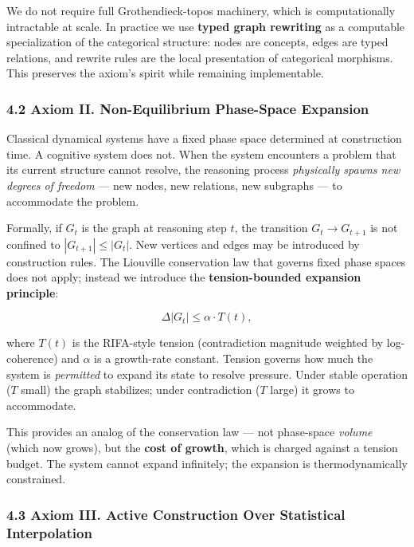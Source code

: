 \documentclass[
  11pt,
  a4paper,
]{article}
\begin{document}
We do not require full Grothendieck-topos machinery, which is
computationally intractable at scale. In practice we use \textbf{typed
graph rewriting} as a computable specialization of the categorical
structure: nodes are concepts, edges are typed relations, and rewrite
rules are the local presentation of categorical morphisms. This
preserves the axiom's spirit while remaining implementable.

\subsubsection{4.2 Axiom II. Non-Equilibrium Phase-Space
Expansion}\label{axiom-ii.-non-equilibrium-phase-space-expansion}

Classical dynamical systems have a fixed phase space determined at
construction time. A cognitive system does not. When the system
encounters a problem that its current structure cannot resolve, the
reasoning process \emph{physically spawns new degrees of freedom} ---
new nodes, new relations, new subgraphs --- to accommodate the problem.

Formally, if \(G_t\) is the graph at reasoning step \(t\), the
transition \(G_t \to G_{t+1}\) is not confined to
\(|G_{t+1}| \leq |G_t|\). New vertices and edges may be introduced by
construction rules. The Liouville conservation law that governs fixed
phase spaces does not apply; instead we introduce the
\textbf{tension-bounded expansion principle}:

\[
\Delta|G_t| \leq \alpha \cdot T(t),
\]

where \(T(t)\) is the RIFA-style tension (contradiction magnitude
weighted by log-coherence) and \(\alpha\) is a growth-rate constant.
Tension governs how much the system is \emph{permitted} to expand its
state to resolve pressure. Under stable operation (\(T\) small) the
graph stabilizes; under contradiction (\(T\) large) it grows to
accommodate.

This provides an analog of the conservation law --- not phase-space
\emph{volume} (which now grows), but the \textbf{cost of growth}, which
is charged against a tension budget. The system cannot expand
infinitely; the expansion is thermodynamically constrained.

\subsubsection{4.3 Axiom III. Active Construction Over Statistical
Interpolation}\label{axiom-iii.-active-construction-over-statistical-interpolation}
\end{document}
